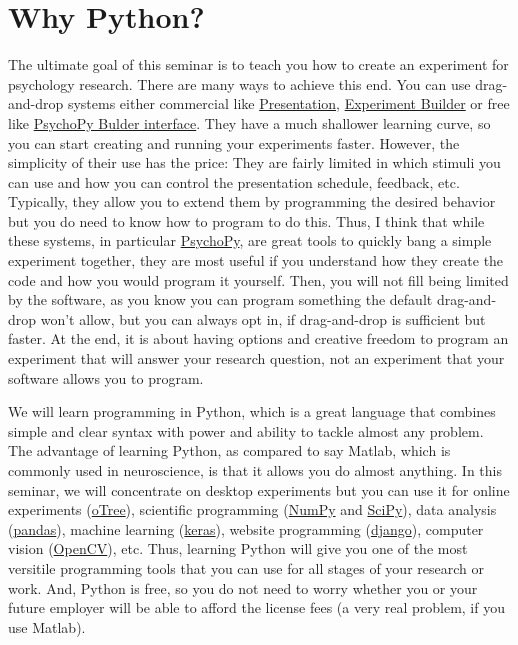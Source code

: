 \documentclass[
]{book}
\begin{document}
\hypertarget{why-python}{%
\section*{Why Python?}\label{why-python}}

The ultimate goal of this seminar is to teach you how to create an experiment for psychology research. There are many ways to achieve this end. You can use drag-and-drop systems either commercial like \href{https://www.neurobs.com/}{Presentation}, \href{https://www.sr-research.com/experiment-builder/}{Experiment Builder} or free like \href{https://psychopy.org/builder}{PsychoPy Bulder interface}. They have a much shallower learning curve, so you can start creating and running your experiments faster. However, the simplicity of their use has the price: They are fairly limited in which stimuli you can use and how you can control the presentation schedule, feedback, etc. Typically, they allow you to extend them by programming the desired behavior but you do need to know how to program to do this. Thus, I think that while these systems, in particular \href{https://psychopy.org/}{PsychoPy}, are great tools to quickly bang a simple experiment together, they are most useful if you understand how they create the code and how you would program it yourself. Then, you will not fill being limited by the software, as you know you can program something the default drag-and-drop won't allow, but you can always opt in, if drag-and-drop is sufficient but faster. At the end, it is about having options and creative freedom to program an experiment that will answer your research question, not an experiment that your software allows you to program.

We will learn programming in Python, which is a great language that combines simple and clear syntax with power and ability to tackle almost any problem. The advantage of learning Python, as compared to say Matlab, which is commonly used in neuroscience, is that it allows you do almost anything. In this seminar, we will concentrate on desktop experiments but you can use it for online experiments (\href{https://otree.readthedocs.io/en/latest/}{oTree}), scientific programming (\href{https://numpy.org/}{NumPy} and \href{https://www.scipy.org/}{SciPy}), data analysis (\href{https://pandas.pydata.org/}{pandas}), machine learning (\href{https://keras.io/}{keras}), website programming (\href{https://www.djangoproject.com/}{django}), computer vision (\href{https://opencv.org/}{OpenCV}), etc. Thus, learning Python will give you one of the most versitile programming tools that you can use for all stages of your research or work. And, Python is free, so you do not need to worry whether you or your future employer will be able to afford the license fees (a very real problem, if you use Matlab).
\end{document}
